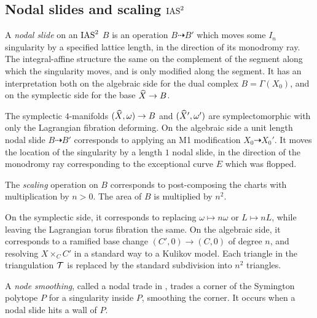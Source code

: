 \documentclass{amsart}
\begin{document}
\subsection{Nodal slides and scaling $\operatorname{IAS}^2$}
\label{sec:surgeries-ias}

A \emph{nodal slide} on an $\operatorname{IAS}^2$ $B$ is an operation
$B\dashrightarrow B'$ which moves some $I_n$
singularity by a specified lattice length,
in the direction of its monodromy ray. The integral-affine
structure the same on the complement of the segment
along which the singularity moves, and is only modified
along the segment. It has an interpretation
both on the algebraic side for the dual complex $B=\Gamma(X_0)$,
and on the symplectic side for the base ${\widehat X}\to B$.

The symplectic $4$-manifolds $({\widehat X},\omega)\to B$ and $({\widehat X}',\omega')$
are symplectomorphic with only the Lagrangian fibration deforming.
On the algebraic side a unit length nodal slide $B\dashrightarrow B'$ 
corresponds to applying an M1 modification $X_0\dashrightarrow X_0'$.
It moves the location of the singularity by a length $1$ nodal slide,
in the direction of the monodromy ray corresponding to the exceptional
curve $E$ which was flopped.

\smallskip

The \emph{scaling} operation on $B$ corresponds to post-composing
the charts with multiplication by $n>0$. The area of $B$ is multiplied by $n^2$. 

On the symplectic side, it corresponds
to replacing $\omega\mapsto n\omega$ or $L\mapsto nL$, while leaving the Lagrangian
torus fibration the same. On the algebraic
side, it corresponds to a ramified base change $(C',0)\to (C,0)$ of
degree $n$, and resolving $X\times_C C'$ in a standard way to a
Kulikov model. Each triangle in the triangulation ${\mathcal T}$ is replaced by
the standard subdivision into $n^2$ triangles. 

\smallskip

\smallskip

A \emph{node smoothing}, called a nodal trade in 
 \cite[Sec.~6]{symington2003four-dimensions}, trades a corner of the
Symington polytope $P$ for a singularity inside $P$, smoothing the
corner. It occurs when a nodal slide hits a wall of $P$.
\end{document}
